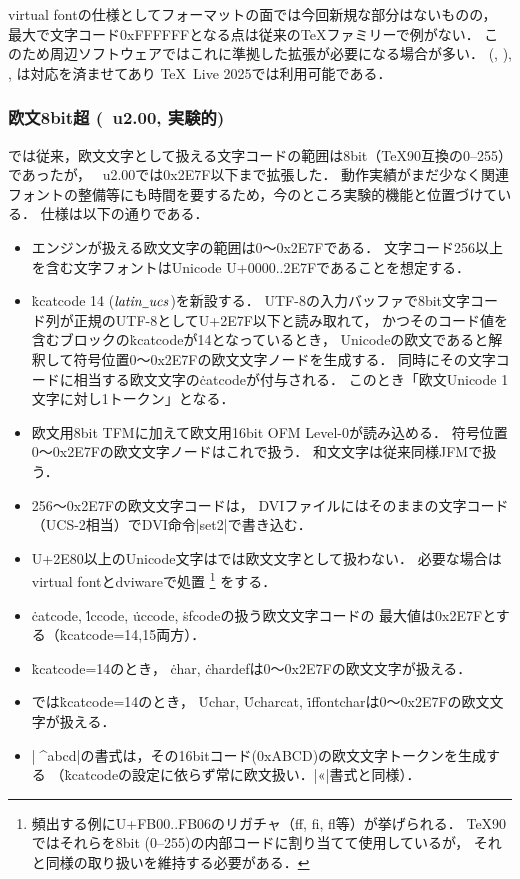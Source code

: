 \documentclass[a4paper,11pt,nomag,dvipdfmx]{jsarticle}
\def\_{\leavevmode\vrule width .45em height -.2ex depth .3ex\relax}
\begin{document}
virtual fontの仕様としてフォーマットの面では今回新規な部分はないものの，
最大で文字コード0xFFFFFFとなる点は従来の\TeX ファミリーで例がない．
このため周辺ソフトウェアではこれに準拠した拡張が必要になる場合が多い．
 (, ), , は対応を済ませてあり
\TeX~Live 2025では利用可能である．


\subsubsection{欧文8bit超 (\upTeX~u2.00, 実験的)}\label{sec:uptex_ofm}
\upTeX では従来，欧文文字として扱える文字コードの範囲は8bit（\TeX90互換の0--255）であったが，
\upTeX~u2.00では0x2E7F以下まで拡張した\cite{tjb170}．
動作実績がまだ少なく関連フォントの整備等にも時間を要するため，今のところ実験的機能と位置づけている．
仕様は以下の通りである．
\begin{itemize}
 \item \upTeX エンジンが扱える欧文文字の範囲は0～0x2E7Fである．
   文字コード256以上を含む文字フォントはUnicode U+0000..2E7Fであることを想定する．
 \item \.{kcatcode} 14 ($\mathit{latin\_ucs}$)を新設する．
   UTF-8の入力バッファで8bit文字コード列が正規のUTF-8としてU+2E7F以下と読み取れて，
   かつそのコード値を含むブロックの\.{kcatcode}が14となっているとき，
   Unicodeの欧文であると解釈して符号位置0～0x2E7Fの欧文文字ノードを生成する．
   同時にその文字コードに相当する欧文文字の\.{catcode}が付与される．
   このとき「欧文Unicode 1文字に対し1トークン」となる．
 \item 欧文用8bit TFMに加えて欧文用16bit OFM Level-0が読み込める．
   符号位置0～0x2E7Fの欧文文字ノードはこれで扱う．
   和文文字は従来同様JFMで扱う．
 \item 256～0x2E7Fの欧文文字コードは，
   DVIファイルにはそのままの文字コード（UCS-2相当）でDVI命令|set2|で書き込む．
 \item U+2E80以上のUnicode文字は\upTeX では欧文文字として扱わない．
   必要な場合はvirtual fontとdviwareで処置%
   \footnote{頻出する例にU+FB00..FB06のリガチャ（ff, fi, fl等）が挙げられる．
   \TeX90ではそれらを8bit (0--255)の内部コードに割り当てて使用しているが，
   それと同様の取り扱いを維持する必要がある．}%
   をする．
 \item \.{catcode}, \.{lccode}, \.{uccode}, \.{sfcode}の扱う欧文文字コードの
   最大値は0x2E7Fとする（\.{kcatcode}=14,15両方）．
 \item \.{kcatcode}=14のとき，
   \.{char}, \.{chardef}は0～0x2E7Fの欧文文字が扱える．
 \item \eupTeX では\.{kcatcode}=14のとき，
   \.{Uchar}, \.{Ucharcat}, \.{iffontchar}は0～0x2E7Fの欧文文字が扱える．
 \item |^^^^abcd|の書式は，その16bitコード(0xABCD)の欧文文字トークンを生成する
   （\.{kcatcode}の設定に依らず常に欧文扱い．|^^ab|書式と同様）．
\end{itemize}
\end{document}
